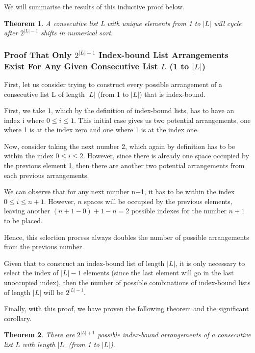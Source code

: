 \documentclass[12pt]{article}
\newtheorem{theorem}{Theorem}[section]
\begin{document}
We will summarise the results of this inductive proof below.

\begin{theorem}
A consecutive list L with unique elements from 1 to $|L|$ will cycle after $2^{|L|-1}$ shifts in numerical sort.
\end{theorem}

\subsubsection{Proof That Only $2^{|L|+1}$ Index-bound List Arrangements Exist For Any Given Consecutive List $L$ (1 to $|L|$)}

First, let us consider trying to construct every possible arrangement of a consecutive list L of length $|L|$ (from 1 to $|L|$) that is index-bound.

First, we take 1, which by the definition of index-bound lists, has to have an index i where $0 \leq i \leq 1$. This initial case gives us two potential arrangements, one where 1 is at the index zero and one where 1 is at the index one.

Now, consider taking the next number 2, which again by definition has to be within the index $0 \leq i \leq 2$. However, since there is already one space occupied by the previous element 1, then there are another two potential arrangements from each previous arrangements.

We can observe that for any next number n+1, it has to be within the index $0 \leq i \leq n+1$. However, $n$ spaces will be occupied by the previous elements, leaving another $(n+1-0)+1-n = 2$ possible indexes for the number $n+1$ to be placed.

Hence, this selection process always doubles the number of possible arrangements from the previous number.

Given that to construct an index-bound list of length $|L|$, it is only necessary to select the index of $|L|-1$ elements (since the last element will go in the last unoccupied index), then the number of possible combinations of index-bound lists of length $|L|$ will be $2^{|L|-1}$.

Finally, with this proof, we have proven the following theorem and the significant corollary.

\begin{theorem}
 There are $2^{|L|+1}$ possible index-bound arrangements of a consecutive list $L$ with length $|L|$ (from 1 to $|L|$).
\end{theorem}
\end{document}

